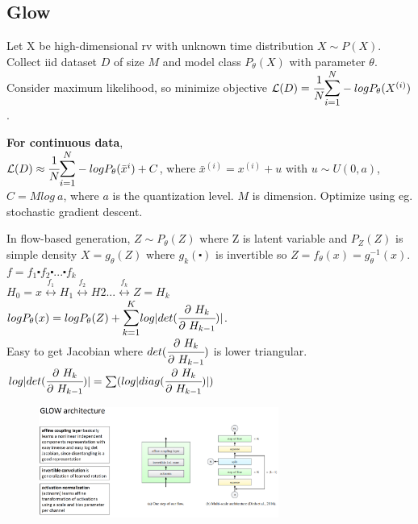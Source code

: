 \documentclass[12pt,a4paper]{article}
\begin{document}
\vspace{0.5cm}
\subsection{Glow}
Let X be high-dimensional rv with unknown time distribution $X\sim P(X)$. Collect iid dataset $D$ of size $M$ and model class $P_\theta(X)$ with parameter $\theta$. 
Consider maximum likelihood, so minimize objective $\lossl(D)=\cfrac{1}{N}\bsum{i=1}{N}-logP_\theta(X^{(i)})$.

\textbf{For continuous data},\\ 
$\lossl(D)\approx \cfrac{1}{N}\bsum{i=1}{N}-logP_\theta(\bar{x}^{i})+C$, where $\bar{x}^{(i)}=x^{(i)}+u$ with $u\sim U(0,a)$, $C=Mlog\ a$, where $a$ is the quantization level. $M$ is dimension. Optimize using eg. stochastic gradient descent. 

In flow-based generation, $Z\sim P_\theta(Z)$ where Z is latent variable and $P_Z(Z)$ is simple density $X=g_\theta(Z)$ where $g_k(\centerdot)$ is invertible so $Z=f_\theta(x)=g_\theta^{-1}(x)$. \\
$f=f_1\centerdot f_2 \centerdot ... \centerdot f_k$\\
$H_0=x\overset{f_1}{\longleftrightarrow}H_1\overset{f_2}{\longleftrightarrow}H2...\overset{f_k}{\longleftrightarrow}Z=H_k$\\
$logP_\theta(x)=logP_\theta(Z)+\bsum{k=1}{K}log|det(\pfrac{H_k}{H_{k-1}})|$. \\
Easy to get Jacobian where $det(\cfrac{\partial\ H_k}{\partial\ H_{k-1}})$ is lower triangular. $log|det(\cfrac{\partial\ H_k}{\partial\ H_{k-1}})|=\sum(log|diag(\cfrac{\partial\ H_k}{\partial\ H_{k-1}})|)$

\begin{figure}[!ht]
    \centering
    \includegraphics[width=0.7\textwidth]{fig/glow_arch.png}
\end{figure} 
\end{document}
